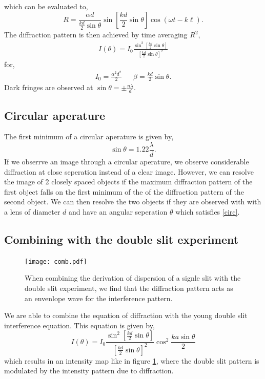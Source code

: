\documentclass{book}
\begin{document}
which can be evaluated to,
\begin{equation}
	R = \frac{\alpha d}{\frac{kd}{2}\sin\theta}\sin\left[\frac{kd}{2}\sin\theta\right]\cos(\omega t - k\ell).
\end{equation}
The diffraction pattern is then achieved by time averaging $R^2$,
\begin{equation}
	\begin{split}
		I(\theta) = I_0 \frac{\sin^2\left[\frac{kd}{2}\sin\theta\right]}{\left[\frac{kd}{2}\sin\theta\right]^2}
	\end{split}
\end{equation}
for,
\begin{align}
	I_0 = \frac{\alpha^2d^2}{2} && \beta = \frac{kd}{2}\sin\theta.
\end{align}
Dark fringes are observed at $\sin\theta = \pm \frac{n\lambda}{d}$.
\subsection{Circular aperature}
The first minimum of a circular aperature is given by,
\begin{equation}
	\sin\theta = 1.22 \frac{\lambda}{d}. \label{circ}
\end{equation}
If we obserrve an image through a circular aperature, we observe considerable diffraction at close seperation instead of a clear image. However, we can resolve the image of 2 closely spaced objects if the maximum diffraction pattern of the first object falls on the first minimum of the of the diffraction pattern of the second object. We can then resolve the two objects if they are observed with with a lens of diameter $d$ and have an angular seperation $\theta$ which satisfies \eqref{circ}.
\subsection{Combining with the double slit experiment}
\begin{figure}
	\centering
	\texttt{[image: comb.pdf]}
	\caption{When combining the derivation of dispersion of a signle slit with the double slit experiment, we find that the diffraction pattern acts as an envenlope wave for the interference pattern.}
	\label{combined}
\end{figure}
We are able to combine the equation of diffraction with the young double slit interference equation. This equation is given by,
\begin{equation}
	I(\theta) = I_0 \frac{\sin^2\left[\frac{kd}{2}\sin\theta\right]}{\left[\frac{kd}{2}\sin\theta\right]^2}\cos^2\frac{ka\sin\theta}{2}
\end{equation}
which results in an intensity map like in figure \ref{combined}, where the double slit pattern is modulated by the intensity pattern due to diffraction.
\end{document}
